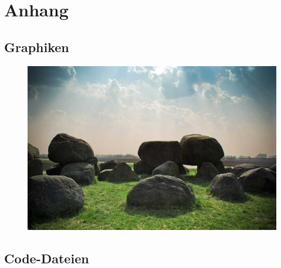 \section{Anhang}

\subsection{Graphiken}

\begin{figure}[h!]
    \centering
    \includegraphics[scale=0.9]{Images/example}
\end{figure}

\subsection{Code-Dateien}

\begin{spacing}{1}
    
\end{spacing}

\newpage
